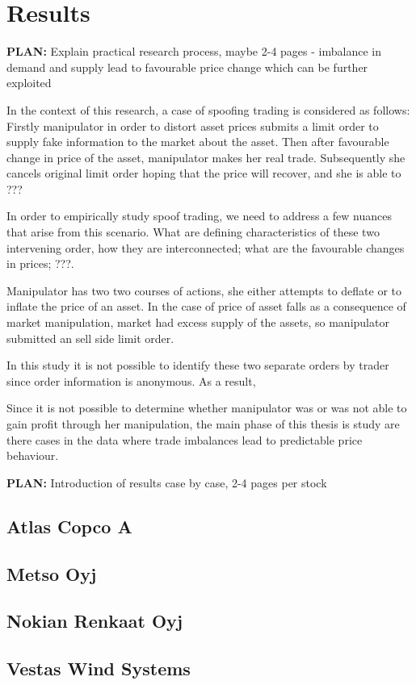 \documentclass{tut-thesis}
\begin{document}
\chapter{Results}
\textbf{PLAN:} Explain practical research process, maybe 2-4 pages
- imbalance in demand and supply lead to favourable price change which can be further exploited

In the context of this research, a case of spoofing trading is considered as follows: Firstly manipulator in order to distort asset prices submits a limit order to supply fake information to the market about the asset. Then after favourable change in price of the asset, manipulator makes her real trade. Subsequently she cancels original limit order hoping that the price will recover, and she is able to ???

In order to empirically study spoof trading, we need to address a few nuances that arise from this scenario. What are defining characteristics of these two intervening order, how they are interconnected; what are the favourable changes in prices; ???. 

Manipulator has two two courses of actions, she either attempts to deflate or to inflate the price of an asset. In the case of price of asset falls as a consequence of market manipulation, market had excess supply of the assets, so manipulator submitted an sell side limit order. 

In this study it is not possible to identify these two separate orders by trader since order information is anonymous. As a result, 

Since it is not possible to determine whether manipulator was or was not able to gain profit through her manipulation, the main phase of this thesis is study are there cases in the data where trade imbalances lead to predictable price behaviour.

\textbf{PLAN:} Introduction of results case by case, 2-4 pages per stock
\section{Atlas Copco A}
\section{Metso Oyj}
\section{Nokian Renkaat Oyj}
\section{Vestas Wind Systems}
\end{document}
